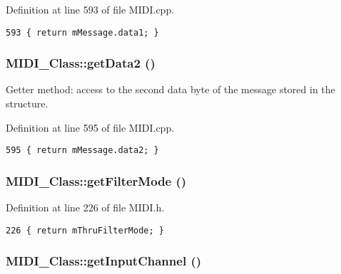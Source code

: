Definition at line 593 of file MIDI.cpp.

\begin{Code}\begin{verbatim}593 { return mMessage.data1; }
\end{verbatim}
\end{Code}


\hypertarget{class_m_i_d_i___class_688f4f57142f1a7dfd1a79bf43e1b74d}{
\subsubsection[{getData2}]{ MIDI\_\-Class::getData2 ()}}
\label{class_m_i_d_i___class_688f4f57142f1a7dfd1a79bf43e1b74d}


Getter method: access to the second data byte of the message stored in the structure. 

Definition at line 595 of file MIDI.cpp.

\begin{Code}\begin{verbatim}595 { return mMessage.data2; }
\end{verbatim}
\end{Code}


\hypertarget{class_m_i_d_i___class_8952fc757cefe98856ba7cfc811bbbb3}{
\subsubsection[{getFilterMode}]{ MIDI\_\-Class::getFilterMode ()}}
\label{class_m_i_d_i___class_8952fc757cefe98856ba7cfc811bbbb3}




Definition at line 226 of file MIDI.h.

\begin{Code}\begin{verbatim}226 { return mThruFilterMode; }
\end{verbatim}
\end{Code}


\hypertarget{class_m_i_d_i___class_f05fb3c0857d2f50d6c21414eb18ef53}{
\subsubsection[{getInputChannel}]{ MIDI\_\-Class::getInputChannel ()}}
\label{class_m_i_d_i___class_f05fb3c0857d2f50d6c21414eb18ef53}




